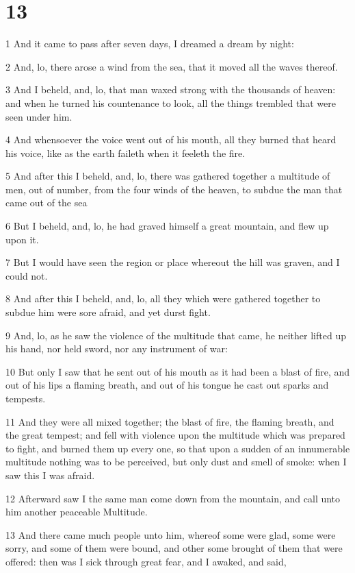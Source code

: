 \chapter{13}

\par 1 And it came to pass after seven days, I dreamed a dream by night:
\par 2 And, lo, there arose a wind from the sea, that it moved all the waves thereof.
\par 3 And I beheld, and, lo, that man waxed strong with the thousands of heaven: and when he turned his countenance to look, all the things trembled that were seen under him.
\par 4 And whensoever the voice went out of his mouth, all they burned that heard his voice, like as the earth faileth when it feeleth the fire.
\par 5 And after this I beheld, and, lo, there was gathered together a multitude of men, out of number, from the four winds of the heaven, to subdue the man that came out of the sea
\par 6 But I beheld, and, lo, he had graved himself a great mountain, and flew up upon it.
\par 7 But I would have seen the region or place whereout the hill was graven, and I could not.
\par 8 And after this I beheld, and, lo, all they which were gathered together to subdue him were sore afraid, and yet durst fight.
\par 9 And, lo, as he saw the violence of the multitude that came, he neither lifted up his hand, nor held sword, nor any instrument of war:
\par 10 But only I saw that he sent out of his mouth as it had been a blast of fire, and out of his lips a flaming breath, and out of his tongue he cast out sparks and tempests.
\par 11 And they were all mixed together; the blast of fire, the flaming breath, and the great tempest; and fell with violence upon the multitude which was prepared to fight, and burned them up every one, so that upon a sudden of an innumerable multitude nothing was to be perceived, but only dust and smell of smoke: when I saw this I was afraid.
\par 12 Afterward saw I the same man come down from the mountain, and call unto him another peaceable Multitude.
\par 13 And there came much people unto him, whereof some were glad, some were sorry, and some of them were bound, and other some brought of them that were offered: then was I sick through great fear, and I awaked, and said,
